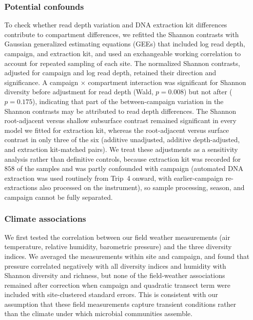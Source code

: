 \documentclass[11pt]{article}
\begin{document}
\subsubsection{Potential confounds}\label{sup:alphadiversity_confounds}
To check whether read depth variation and DNA extraction kit differences contribute to compartment differences, we refitted the Shannon contrasts with Gaussian generalized estimating equations (GEEs) that included log read depth, campaign, and extraction kit, and used an exchangeable working correlation to account for repeated sampling of each site. The normalized Shannon contrasts, adjusted for campaign and log read depth, retained their direction and significance. A campaign $\times$ compartment interaction was significant for Shannon diversity before adjustment for read depth (Wald, $p = 0.008$) but not after ($p = 0.175$), indicating that part of the between-campaign variation in the Shannon contrasts may be attributed to read depth differences. The Shannon root-adjacent versus shallow subsurface contrast remained significant in every model we fitted for extraction kit, whereas the root-adjacent versus surface contrast in only three of the six (additive unadjusted, additive depth-adjusted, and extraction kit-matched pairs). We treat these adjustments as a sensitivity analysis rather than definitive controls, because extraction kit was recorded for $858$ of the samples and was partly confounded with campaign (automated DNA extraction was used routinely from Trip~4 onward, with earlier-campaign re-extractions also processed on the instrument), so sample processing, season, and campaign cannot be fully separated.

\subsubsection{Climate associations}\label{sup:alphadiversity_climate}
We first tested the correlation between our field weather measurements (air temperature, relative humidity, barometric pressure) and the three diversity indices. We averaged the measurements within site and campaign, and found that pressure correlated negatively with all diversity indices and humidity with Shannon diversity and richness, but none of the field-weather associations remained after correction when campaign and quadratic transect term were included with site-clustered standard errors. This is consistent with our assumption that these field measurements capture transient conditions rather than the climate under which microbial communities assemble.
\end{document}
